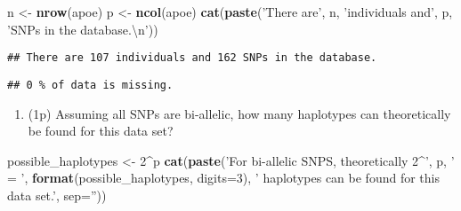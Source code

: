 \documentclass[
]{article}
\newenvironment{Shaded}{\begin{snugshade}}{\end{snugshade}}
\newcommand{\CharTok}[1]{\textcolor[rgb]{0.31,0.60,0.02}{#1}}
\newcommand{\DataTypeTok}[1]{\textcolor[rgb]{0.13,0.29,0.53}{#1}}
\newcommand{\DecValTok}[1]{\textcolor[rgb]{0.00,0.00,0.81}{#1}}
\newcommand{\KeywordTok}[1]{\textcolor[rgb]{0.13,0.29,0.53}{\textbf{#1}}}
\newcommand{\NormalTok}[1]{#1}
\newcommand{\OperatorTok}[1]{\textcolor[rgb]{0.81,0.36,0.00}{\textbf{#1}}}
\newcommand{\StringTok}[1]{\textcolor[rgb]{0.31,0.60,0.02}{#1}}
\providecommand{\tightlist}{%
  \setlength{\itemsep}{0pt}\setlength{\parskip}{0pt}}
\begin{document}
\begin{Shaded}
\begin{Highlighting}[]
\NormalTok{n <-}\StringTok{ }\KeywordTok{nrow}\NormalTok{(apoe)}
\NormalTok{p <-}\StringTok{ }\KeywordTok{ncol}\NormalTok{(apoe)}
\KeywordTok{cat}\NormalTok{(}\KeywordTok{paste}\NormalTok{(}\StringTok{'There are'}\NormalTok{, n, }\StringTok{'individuals and'}\NormalTok{, p, }\StringTok{'SNPs in the database.}\CharTok{\textbackslash{}n}\StringTok{'}\NormalTok{))}
\end{Highlighting}
\end{Shaded}

\begin{verbatim}
## There are 107 individuals and 162 SNPs in the database.
\end{verbatim}

\begin{Shaded}
\end{Shaded}

\begin{verbatim}
## 0 % of data is missing.
\end{verbatim}

\begin{enumerate}
\def\labelenumi{\arabic{enumi}.}
\setcounter{enumi}{2}
\tightlist
\item
  (1p) Assuming all SNPs are bi-allelic, how many haplotypes can
  theoretically be found for this data set?
\end{enumerate}

\begin{Shaded}
\begin{Highlighting}[]
\NormalTok{possible_haplotypes <-}\StringTok{ }\DecValTok{2}\OperatorTok{^}\NormalTok{p}
\KeywordTok{cat}\NormalTok{(}\KeywordTok{paste}\NormalTok{(}\StringTok{'For bi-allelic SNPS, theoretically 2^'}\NormalTok{, p, }\StringTok{' = '}\NormalTok{, }\KeywordTok{format}\NormalTok{(possible_haplotypes, }\DataTypeTok{digits=}\DecValTok{3}\NormalTok{), }\StringTok{' haplotypes can be found for this data set.'}\NormalTok{, }\DataTypeTok{sep=}\StringTok{''}\NormalTok{))}
\end{Highlighting}
\end{Shaded}
\end{document}
